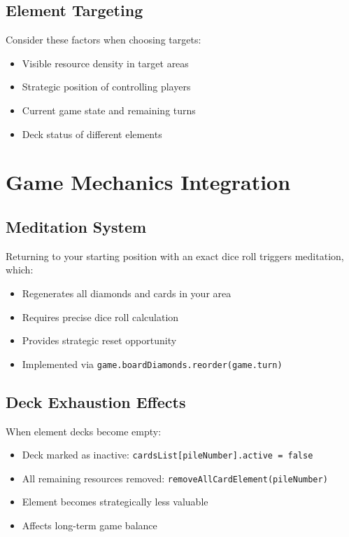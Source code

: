 \documentclass[12pt,a4paper]{article}
\begin{document}
\subsection{Element Targeting}
Consider these factors when choosing targets:
\begin{itemize}
    \item Visible resource density in target areas
    \item Strategic position of controlling players
    \item Current game state and remaining turns
    \item Deck status of different elements
\end{itemize}

\section{Game Mechanics Integration}

\subsection{Meditation System}
Returning to your starting position with an exact dice roll triggers meditation, which:
\begin{itemize}
    \item Regenerates all diamonds and cards in your area
    \item Requires precise dice roll calculation
    \item Provides strategic reset opportunity
    \item Implemented via \texttt{game.boardDiamonds.reorder(game.turn)}
\end{itemize}

\subsection{Deck Exhaustion Effects}
When element decks become empty:
\begin{itemize}
    \item Deck marked as inactive: \texttt{cardsList[pileNumber].active = false}
    \item All remaining resources removed: \texttt{removeAllCardElement(pileNumber)}
    \item Element becomes strategically less valuable
    \item Affects long-term game balance
\end{itemize}
\end{document}
